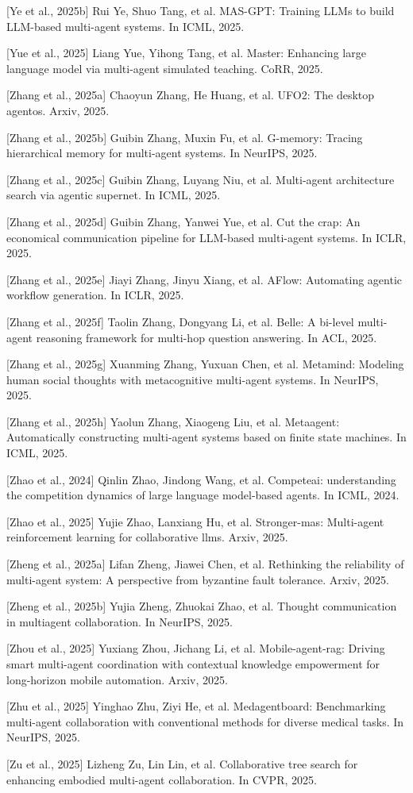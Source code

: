 \documentclass[UTF8,a4paper,12pt]{article}
\begin{document}
{[}Ye et al., 2025b{]} Rui Ye, Shuo Tang, et al. MAS-GPT: Training LLMs to build LLM-based multi-agent systems. In ICML, 2025.

{[}Yue et al., 2025{]} Liang Yue, Yihong Tang, et al. Master: Enhancing large language model via multi-agent simulated teaching. CoRR, 2025.

{[}Zhang et al., 2025a{]} Chaoyun Zhang, He Huang, et al. UFO2: The desktop agentos. Arxiv, 2025.

{[}Zhang et al., 2025b{]} Guibin Zhang, Muxin Fu, et al. G-memory: Tracing hierarchical memory for multi-agent systems. In NeurIPS, 2025.

{[}Zhang et al., 2025c{]} Guibin Zhang, Luyang Niu, et al. Multi-agent architecture search via agentic supernet. In ICML, 2025.

{[}Zhang et al., 2025d{]} Guibin Zhang, Yanwei Yue, et al. Cut the crap: An economical communication pipeline for LLM-based multi-agent systems. In ICLR, 2025.

{[}Zhang et al., 2025e{]} Jiayi Zhang, Jinyu Xiang, et al. AFlow: Automating agentic workflow generation. In ICLR, 2025.

{[}Zhang et al., 2025f{]} Taolin Zhang, Dongyang Li, et al. Belle: A bi-level multi-agent reasoning framework for multi-hop question answering. In ACL, 2025.

{[}Zhang et al., 2025g{]} Xuanming Zhang, Yuxuan Chen, et al. Metamind: Modeling human social thoughts with metacognitive multi-agent systems. In NeurIPS, 2025.

{[}Zhang et al., 2025h{]} Yaolun Zhang, Xiaogeng Liu, et al. Metaagent: Automatically constructing multi-agent systems based on finite state machines. In ICML, 2025.

{[}Zhao et al., 2024{]} Qinlin Zhao, Jindong Wang, et al. Competeai: understanding the competition dynamics of large language model-based agents. In ICML, 2024.

{[}Zhao et al., 2025{]} Yujie Zhao, Lanxiang Hu, et al. Stronger-mas: Multi-agent reinforcement learning for collaborative llms. Arxiv, 2025.

{[}Zheng et al., 2025a{]} Lifan Zheng, Jiawei Chen, et al. Rethinking the reliability of multi-agent system: A perspective from byzantine fault tolerance. Arxiv, 2025.

{[}Zheng et al., 2025b{]} Yujia Zheng, Zhuokai Zhao, et al. Thought communication in multiagent collaboration. In NeurIPS, 2025.

{[}Zhou et al., 2025{]} Yuxiang Zhou, Jichang Li, et al. Mobile-agent-rag: Driving smart multi-agent coordination with contextual knowledge empowerment for long-horizon mobile automation. Arxiv, 2025.

{[}Zhu et al., 2025{]} Yinghao Zhu, Ziyi He, et al. Medagentboard: Benchmarking multi-agent collaboration with conventional methods for diverse medical tasks. In NeurIPS, 2025.

{[}Zu et al., 2025{]} Lizheng Zu, Lin Lin, et al. Collaborative tree search for enhancing embodied multi-agent collaboration. In CVPR, 2025.
\end{document}

